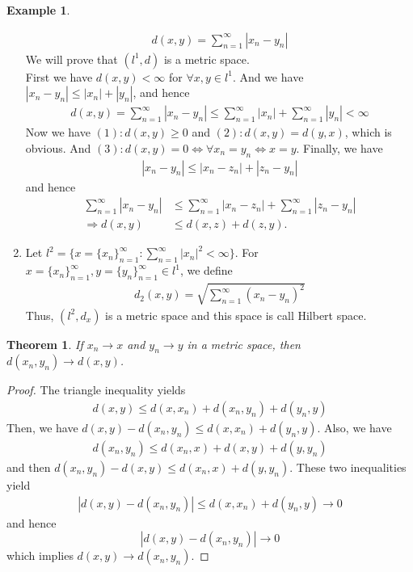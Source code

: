 \documentclass[12pt,leqno]{amsart}
\newtheorem{theorem}{Theorem}[section]
\theoremstyle{definition}
\newtheorem{example}{Example}[section]
\numberwithin{equation}{subsection}
\begin{document}
\begin{example}
\begin{enumerate}
    \begin{align*}
        d(x,y) = \sum^\infty_{n=1} |x_n - y_n|
    \end{align*}
    We will prove that $(l^1,d)$ is a metric space.\\
    First we have $d(x,y) < \infty$ for $\forall x,y \in l^1$. And we   have $|x_n-y_n|\leq |x_n|+|y_n|$, and hence
    \begin{align*}
        d(x,y) = \sum^\infty_{n=1} |x_n - y_n| \leq \sum^\infty_{n=1} |x_n| + \sum^\infty_{n=1} |y_n| < \infty
    \end{align*}
    Now we have $(1):d(x,y) \geq 0$ and $(2):d(x,y) = d(y,x)$, which is     obvious. And $(3): d(x,y) = 0 \Leftrightarrow \forall x_n = y_n \Leftrightarrow x =     y$. Finally, we have 
    \begin{align*}
        |x_n - y_n| \leq |x_n - z_n| + |z_n - y_n|
    \end{align*}
    and hence 
    \begin{align*}
        \sum^\infty_{n=1}|x_n - y_n| & \leq \sum^\infty_{n=1}|x_n - z_n| +     \sum^\infty_{n=1}|z_n - y_n|\\
        \Rightarrow d(x,y) & \leq d(x,z) + d(z,y).
    \end{align*}
    \item Let $l^2 = \{x = \{x_n\}^\infty_{n=1}: \sum^\infty_{n=1}|x_n|^2 < \infty\}$. For $x = \{x_n\}^\infty_{n=1}, y = \{y_n\}^\infty_{n=1} \in l^1$, we define
    \begin{align*}
        d_2(x,y) = \sqrt{\sum^\infty_{n=1} (x_n - y_n)^2}
    \end{align*}
    Thus, $(l^2, d_x)$ is a metric space and this space is call Hilbert space.
\end{enumerate}
\end{example} 

\medskip

\begin{theorem}
If $x_n\rightarrow x$ and $y_n\rightarrow y$ in a metric space, then $d(x_n, y_n) \rightarrow d(x,y)$.
\end{theorem}
\begin{proof}
The triangle inequality yields 
\begin{align*}
    d(x,y) \leq d(x,x_n) + d(x_n,y_n) + d(y_n,y)
\end{align*}
Then, we have $d(x,y) - d(x_n,y_n) \leq d(x,x_n) + d(y_n,y)$. Also, we have 
\begin{align*}
    d(x_n,y_n)\leq d(x_n,x) + d(x,y) + d(y,y_n)
\end{align*}
and then $d(x_n,y_n) - d(x,y)\leq d(x_n,x) + d(y,y_n)$. These two inequalities yield 
\begin{align*}
    |d(x,y) - d(x_n,y_n)| \leq d(x,x_n) + d(y_n,y) \to 0 
\end{align*}
and hence $$|d(x,y) - d(x_n,y_n)| \to 0 $$ which implies $d(x,y) \to d(x_n,y_n)$.
\end{proof}
\end{document}
